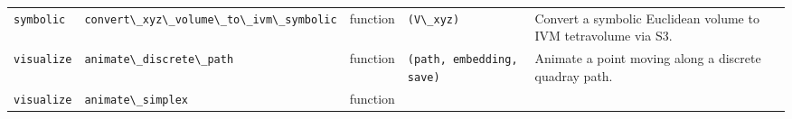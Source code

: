 \documentclass[
  10pt,
]{article}
\newcommand{\passthrough}[1]{#1}
\begin{document}
\begin{longtable}[]{@{}lllll@{}}
\begin{minipage}[t]{0.17\columnwidth}\raggedright
\passthrough{\lstinline!symbolic!}\strut
\end{minipage} & \begin{minipage}[t]{0.17\columnwidth}\raggedright
\passthrough{\lstinline!convert\_xyz\_volume\_to\_ivm\_symbolic!}\strut
\end{minipage} & \begin{minipage}[t]{0.17\columnwidth}\raggedright
function\strut
\end{minipage} & \begin{minipage}[t]{0.17\columnwidth}\raggedright
\passthrough{\lstinline!(V\_xyz)!}\strut
\end{minipage} & \begin{minipage}[t]{0.17\columnwidth}\raggedright
Convert a symbolic Euclidean volume to IVM tetravolume via S3.\strut
\end{minipage}\tabularnewline
\begin{minipage}[t]{0.17\columnwidth}\raggedright
\passthrough{\lstinline!visualize!}\strut
\end{minipage} & \begin{minipage}[t]{0.17\columnwidth}\raggedright
\passthrough{\lstinline!animate\_discrete\_path!}\strut
\end{minipage} & \begin{minipage}[t]{0.17\columnwidth}\raggedright
function\strut
\end{minipage} & \begin{minipage}[t]{0.17\columnwidth}\raggedright
\passthrough{\lstinline!(path, embedding, save)!}\strut
\end{minipage} & \begin{minipage}[t]{0.17\columnwidth}\raggedright
Animate a point moving along a discrete quadray path.\strut
\end{minipage}\tabularnewline
\begin{minipage}[t]{0.17\columnwidth}\raggedright
\passthrough{\lstinline!visualize!}\strut
\end{minipage} & \begin{minipage}[t]{0.17\columnwidth}\raggedright
\passthrough{\lstinline!animate\_simplex!}\strut
\end{minipage} & \begin{minipage}[t]{0.17\columnwidth}\raggedright
function\strut
\end{minipage} & \begin{minipage}[t]{0.17\columnwidth}\raggedright

\end{minipage}
\end{longtable}
\end{document}
